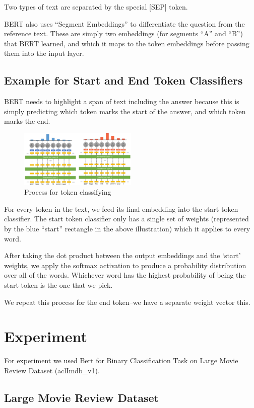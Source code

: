 \documentclass[11pt]{article}
\begin{document}
Two types of text are separated by the special [SEP] token.

BERT also uses “Segment Embeddings” to differentiate the question from the reference text. These are simply two embeddings (for segments “A” and “B”) that BERT learned, and which it maps to the token embeddings before passing them into the input layer.
\cite{QAwithBERT}
\subsection{Example for Start and End Token Classifiers}

\quad BERT needs to highlight a span of text including the answer because this is simply predicting which token marks the start of the answer, and which token marks the end.

\begin{figure}[h]
	\centering
	\includegraphics[width=0.5\textwidth]{fig2.png}
	\caption{Process for token classifying}
	\label{fig1}
\end{figure}

For every token in the text, we feed its final embedding into the start token classifier. The start token classifier only has a single set of weights (represented by the blue “start” rectangle in the above illustration) which it applies to every word.

After taking the dot product between the output embeddings and the ‘start’ weights, we apply the softmax activation to produce a probability distribution over all of the words. Whichever word has the highest probability of being the start token is the one that we pick.

We repeat this process for the end token–we have a separate weight vector this. \cite{QAwithBERT}

\section{Experiment}

\quad For experiment we used Bert for Binary Classification Task on Large Movie Review Dataset (aclImdb\_v1).

\subsection{ Large Movie Review Dataset}
\end{document}
